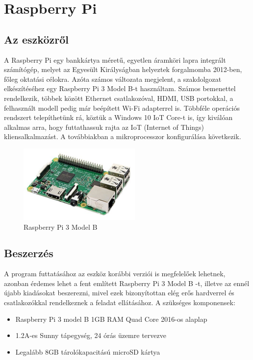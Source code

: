 \documentclass[a4paper,12pt]{report}
\begin{document}
\section{Raspberry Pi}

\subsection{Az eszközről}
    A Raspberry Pi egy bankkártya méretű, egyetlen áramköri lapra integrált számítógép, melyet az Egyesült Királyságban
    helyeztek forgalmomba 2012-ben, főleg oktatási célokra. Azóta számos változata megjelent, a szakdolgozat elkészítéséhez
    egy Raspberry Pi 3 Model B-t használtam. Számos bemenettel rendelkezik, többek között Ethernet csatlakozóval, HDMI, USB
    portokkal, a felhasznált modell pedig már beépített Wi-Fi adapterrel is. Többféle operációs rendszert telepíthetünk rá,
    köztük a Windows 10 IoT Core-t is, így kiválóan alkalmas arra, hogy futtathassuk rajta az IoT (Internet of Things) kliensalkalmazást.
    A továbbiakban a mikroprocesszor konfigurálása következik.

\begin{figure}[h!]
    \hspace{5cm}
    \includegraphics[width=6cm]{images/raspberry_pi3.jpg}
    \caption{Raspberry Pi 3 Model B}
    \label{fig: Raspberry Pi 3}
\end{figure}

\subsection{Beszerzés}
    A program futtatásához az eszköz korábbi verziói is megfelelőek lehetnek, azonban érdemes lehet a fent említett Raspberry Pi 3
    Model B -t, illetve az ennél újabb kiadásokat beszerezni, mivel ezek bizonyítottan elég erős hardverrel és csatlakozókkal rendelkeznek
    a feladat ellátásához. A szükséges komponensek:

\begin{itemize}
    \item Raspberry Pi 3 model B 1GB RAM Quad Core 2016-os alaplap
    \item 1.2A-es Sunny tápegység, 24 órás üzemre tervezve
    \item Legalább 8GB tárolókapacitású microSD kártya
\end{itemize}
\end{document}
